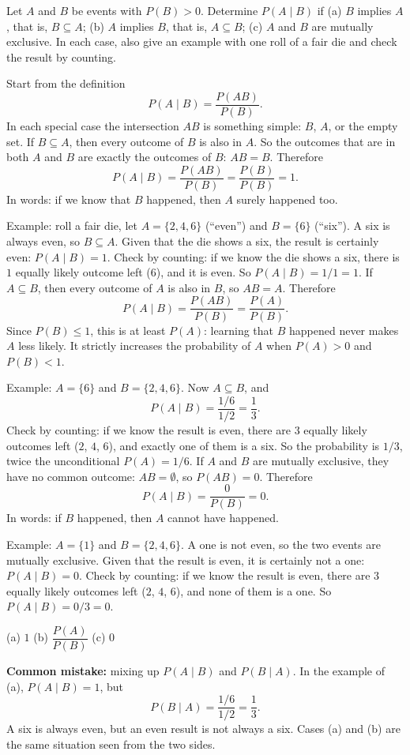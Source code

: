 
\begin{problem}
	Let $A$ and $B$ be events with $P(B)>0$. Determine $P(A\mid B)$ if
	(a) $B$ implies $A$, that is, $B\subseteq A$;
	(b) $A$ implies $B$, that is, $A\subseteq B$;
	(c) $A$ and $B$ are mutually exclusive.
	In each case, also give an example with one roll of a fair die and check
	the result by counting.
\end{problem}

\begin{solution}
	\idea Start from the definition
	\[ P(A\mid B)=\frac{P(AB)}{P(B)}. \]
	In each special case the intersection $AB$ is something simple: $B$, $A$,
	or the empty set.
	 If $B\subseteq A$, then every outcome of $B$ is also in $A$. So
	the outcomes that are in both $A$ and $B$ are exactly the outcomes of $B$:
	$AB=B$. Therefore
	\[ P(A\mid B)=\frac{P(AB)}{P(B)}=\frac{P(B)}{P(B)}=1. \]
	In words: if we know that $B$ happened, then $A$ surely happened too.

	Example: roll a fair die, let $A=\{2,4,6\}$ (``even'') and $B=\{6\}$
	(``six''). A six is always even, so $B\subseteq A$. Given that the die shows
	a six, the result is certainly even: $P(A\mid B)=1$.
	Check by counting: if we know the die shows a six, there is $1$ equally
	likely outcome left ($6$), and it is even. So $P(A\mid B)=1/1=1$.
	 If $A\subseteq B$, then every outcome of $A$ is also in $B$, so
	$AB=A$. Therefore
	\[ P(A\mid B)=\frac{P(AB)}{P(B)}=\frac{P(A)}{P(B)}. \]
	Since $P(B)\le1$, this is at least $P(A)$: learning that $B$ happened never
	makes $A$ less likely. It strictly increases the probability of $A$ when
	$P(A)>0$ and $P(B)<1$.

	Example: $A=\{6\}$ and $B=\{2,4,6\}$. Now $A\subseteq B$, and
	\[ P(A\mid B)=\frac{1/6}{1/2}=\frac13. \]
	Check by counting: if we know the result is even, there are $3$ equally
	likely outcomes left ($2$, $4$, $6$), and exactly one of them is a six.
	So the probability is $1/3$, twice the unconditional $P(A)=1/6$.
	 If $A$ and $B$ are mutually exclusive, they have no common
	outcome: $AB=\emptyset$, so $P(AB)=0$. Therefore
	\[ P(A\mid B)=\frac{0}{P(B)}=0. \]
	In words: if $B$ happened, then $A$ cannot have happened.

	Example: $A=\{1\}$ and $B=\{2,4,6\}$. A one is not even, so the two events
	are mutually exclusive. Given that the result is even, it is certainly not
	a one: $P(A\mid B)=0$.
	Check by counting: if we know the result is even, there are $3$ equally
	likely outcomes left ($2$, $4$, $6$), and none of them is a one. So
	$P(A\mid B)=0/3=0$.
	\begin{answer}
		(a) $1$ \quad (b) $\dfrac{P(A)}{P(B)}$ \quad (c) $0$
	\end{answer}
	\begin{remark}
		\textbf{Common mistake:} mixing up $P(A\mid B)$ and $P(B\mid A)$. In
		the example of (a), $P(A\mid B)=1$, but
		\[ P(B\mid A)=\frac{1/6}{1/2}=\frac13. \]
		A six is always even, but an even result is not always a six. Cases (a)
		and (b) are the same situation seen from the two sides.


\end{remark}
\end{solution}
